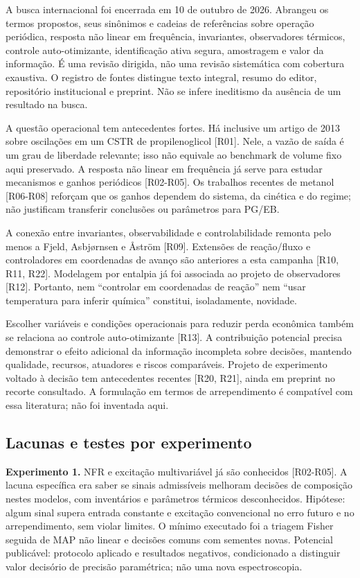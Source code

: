 \documentclass[
  11pt,
  letterpaper,
]{article}
\begin{document}
A busca internacional foi encerrada em 10 de outubro de 2026. Abrangeu
os termos propostos, seus sinônimos e cadeias de referências sobre
operação periódica, resposta não linear em frequência, invariantes,
observadores térmicos, controle auto-otimizante, identificação ativa
segura, amostragem e valor da informação. É uma revisão dirigida, não
uma revisão sistemática com cobertura exaustiva. O registro de fontes
distingue texto integral, resumo do editor, repositório institucional e
preprint. Não se infere ineditismo da ausência de um resultado na busca.

A questão operacional tem antecedentes fortes. Há inclusive um artigo de
2013 sobre oscilações em um CSTR de propilenoglicol {[}R01{]}. Nele, a
vazão de saída é um grau de liberdade relevante; isso não equivale ao
benchmark de volume fixo aqui preservado. A resposta não linear em
frequência já serve para estudar mecanismos e ganhos periódicos
{[}R02-R05{]}. Os trabalhos recentes de metanol {[}R06-R08{]} reforçam
que os ganhos dependem do sistema, da cinética e do regime; não
justificam transferir conclusões ou parâmetros para PG/EB.

A conexão entre invariantes, observabilidade e controlabilidade remonta
pelo menos a Fjeld, Asbjørnsen e Åström {[}R09{]}. Extensões de
reação/fluxo e controladores em coordenadas de avanço são anteriores a
esta campanha {[}R10, R11, R22{]}. Modelagem por entalpia já foi
associada ao projeto de observadores {[}R12{]}. Portanto, nem
``controlar em coordenadas de reação'' nem ``usar temperatura para
inferir química'' constitui, isoladamente, novidade.

Escolher variáveis e condições operacionais para reduzir perda econômica
também se relaciona ao controle auto-otimizante {[}R13{]}. A
contribuição potencial precisa demonstrar o efeito adicional da
informação incompleta sobre decisões, mantendo qualidade, recursos,
atuadores e riscos comparáveis. Projeto de experimento voltado à decisão
tem antecedentes recentes {[}R20, R21{]}, ainda em preprint no recorte
consultado. A formulação em termos de arrependimento é compatível com
essa literatura; não foi inventada aqui.

\hypertarget{lacunas-e-testes-por-experimento}{%
\subsection{Lacunas e testes por
experimento}\label{lacunas-e-testes-por-experimento}}

\textbf{Experimento 1.} NFR e excitação multivariável já são conhecidos
{[}R02-R05{]}. A lacuna específica era saber se sinais admissíveis
melhoram decisões de composição nestes modelos, com inventários e
parâmetros térmicos desconhecidos. Hipótese: algum sinal supera entrada
constante e excitação convencional no erro futuro e no arrependimento,
sem violar limites. O mínimo executado foi a triagem Fisher seguida de
MAP não linear e decisões comuns com sementes novas. Potencial
publicável: protocolo aplicado e resultados negativos, condicionado a
distinguir valor decisório de precisão paramétrica; não uma nova
espectroscopia.
\end{document}
